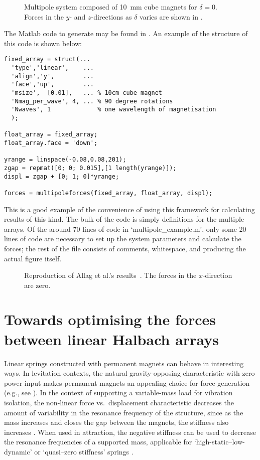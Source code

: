 \documentclass[11pt,a4paper]{memoir}
\begin{document}
\begin{figure}
\centering
{}
\caption{Multipole system composed of \SI{10}{mm} cube magnets for $\delta=0$. Forces in the $y$- and $z$-directions as $\delta$ varies are shown in .}
\end{figure}

The Matlab code to generate  may be found in .
An example of the structure of this code is shown below:
\begin{verbatim}
fixed_array = struct(...
  'type','linear',    ...
  'align','y',        ...
  'face','up',        ...
  'msize',  [0.01],   ... % 10cm cube magnet
  'Nmag_per_wave', 4, ... % 90 degree rotations
  'Nwaves', 1             % one wavelength of magnetisation
  );

float_array = fixed_array;
float_array.face = 'down';

yrange = linspace(-0.08,0.08,201);
zgap = repmat([0; 0; 0.015],[1 length(yrange)]);
displ = zgap + [0; 1; 0]*yrange;

forces = multipoleforces(fixed_array, float_array, displ);
\end{verbatim}
This is a good example of the convenience of using this framework for calculating results of this kind.
The bulk of the code is simply definitions for the multiple arrays.
Of the around 70 lines of code in `multipole\_example.m', only some 20 lines of code are necessary to set up the system parameters and calculate the forces; the rest of the file consists of comments, whitespace, and producing the actual figure itself.

\begin{figure}
\centering
{}
\lofcaption
{ Reproduction of Allag et al.'s results~\textcite{allag2009-electromotion}.}
{
  The forces in the $x$-direction are zero.
}
\end{figure}





\section{Towards optimising the forces between linear Halbach arrays}

Linear springs constructed with permanent magnets can behave in interesting ways. In levitation contexts, the natural gravity-opposing characteristic with zero power input makes permanent magnets an appealing choice for force generation (e.g., see \cite{iniguez2010-jmmm}). In the context of supporting a variable-mass load for vibration isolation, the non-linear force vs.\ displacement characteristic decreases the amount of variability in the resonance frequency of the structure, since as the mass increases and closes the gap between the magnets, the stiffness also increases \parencite{bonisoli2007-mrc}. When used in attraction, the negative stiffness can be used to decrease the resonance frequencies of a supported mass, applicable for `high-static--low-dynamic' or `quasi--zero stiffness' springs \parencite{carrella2008-jsv,robertson2009-jsv}.
\end{document}
